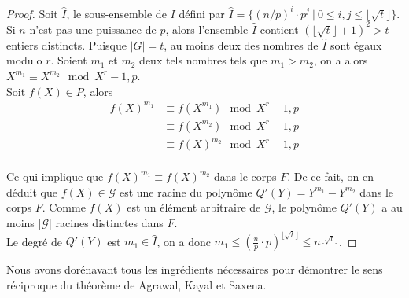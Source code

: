 \documentclass[11pt]{article}
\begin{document}
\begin{small}
\begin{proof}
Soit $\hat I$, le sous-ensemble de $I$ défini par $\hat I=\{(n/p)^i \cdot p^j\ \vert \ 0 \leqslant i,j \leqslant \lfloor \sqrt{t} \rfloor \}$.\\

\noindent
Si $n$ n'est pas une puissance de $p$, alors l'ensemble $\hat I$ contient $(\lfloor \sqrt{t} \rfloor +1)^2 > t$ entiers distincts. Puisque $\vert G \vert = t$, au moins deux des nombres de $\hat I$ sont égaux modulo $r$. Soient $m_1$ et $m_2$ deux tels nombres tels que $m_1 > m_2$, on a alors $X^{m_1} \equiv X^{m_2} \mod X^r-1,p$.\\

\noindent
Soit $f(X) \in P$, alors
\begin{align*}
f(X)^{m_1} &\equiv f(X^{m_1}) \mod X^r-1,p\\
&\equiv f(X^{m_2}) \mod X^r-1,p\\
&\equiv f(X)^{m_2} \mod X^r-1,p\\
\end{align*}

\newpage

\noindent
Ce qui implique que $f(X)^{m_1} \equiv f(X)^{m_2}$ dans le corps $F$. De ce fait, on en déduit que $f(X) \in \mathcal{G}$ est une racine du polynôme $Q'(Y)=Y^{m_1}-Y^{m_2}$ dans le corps $F$. Comme $f(X)$ est un élément arbitraire de $\mathcal{G}$, le polynôme $Q'(Y)$ a au moins $\vert \mathcal{G} \vert$ racines distinctes dans $F$.\\

\noindent
Le degré de $Q'(Y)$ est $m_1 \in \hat I$, on a donc $m_1 \leqslant (\frac{n}{p} \cdot p)^{\lfloor \sqrt{t} \rfloor} \leqslant n^{\lfloor \sqrt{t} \rfloor}$.
\end{proof}
\end{small}

Nous avons dorénavant tous les ingrédients nécessaires pour démontrer le sens réciproque du théorème de Agrawal, Kayal et Saxena.
\end{document}
